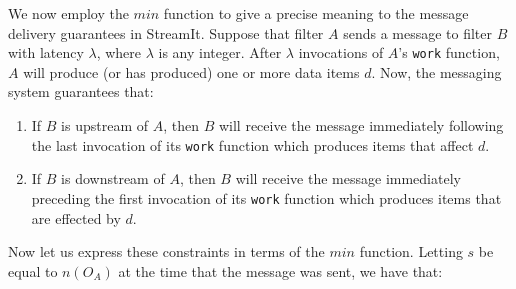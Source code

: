 We now employ the $min$ function to give a precise meaning to the
message delivery guarantees in StreamIt.  Suppose that filter $A$
sends a message to filter $B$ with latency $\lambda$, where $\lambda$
is any integer.  After $\lambda$ invocations of $A$'s {\tt work}
function, $A$ will produce (or has produced) one or more data items
$d$.  Now, the messaging system guarantees that:
\begin{enumerate}

\item If $B$ is upstream of $A$, then $B$ will receive the message
immediately following the last invocation of its {\tt work} function
which produces items that affect $d$.

\item If $B$ is downstream of $A$, then $B$ will receive the message
immediately preceding the first invocation of its {\tt work} function
which produces items that are effected by $d$.

\end{enumerate}
Now let us express these constraints in terms of the $min$ function.
Letting $s$ be equal to $n(O_A)$ at the time that the message was
sent, we have that:
